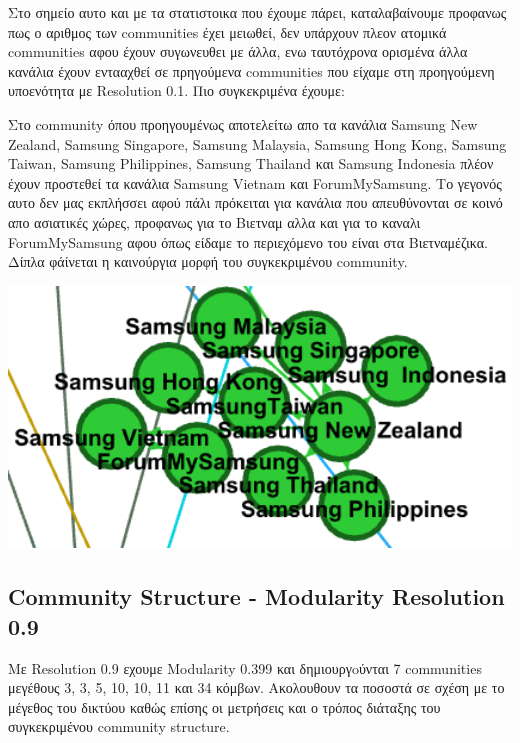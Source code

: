 \documentclass[12pt]{article}
\begin{document}
	\newpage
	Στο σημείο αυτο και με τα στατιστοικα που έχουμε πάρει, καταλαβαίνουμε προφανως πως ο αριθμος των communities έχει μειωθεί, δεν υπάρχουν πλεον ατομικά communities αφου έχουν συγωνευθει με άλλα, ενω ταυτόχρονα ορισμένα άλλα κανάλια έχουν εντααχθεί σε πρηγούμενα communities που είχαμε στη προηγούμενη υποενότητα με Resolution 0.1. Πιο συγκεκριμένα έχουμε:
	
	\vspace{12pt}
	\vspace{12pt}
	\vspace{12pt}
	\begin{minipage}{0.6\textwidth}
		Στο community όπου προηγουμένως αποτελείτω απο τα κανάλια Samsung New Zealand, Samsung Singapore, Samsung Malaysia, Samsung Hong Kong, Samsung Taiwan, Samsung Philippines, Samsung Thailand και Samsung Indonesia πλέον έχουν προστεθεί τα κανάλια Samsung Vietnam και ForumMySamsung. Το γεγονός αυτο δεν μας εκπλήσσει αφού πάλι πρόκειται για κανάλια που απευθύνονται σε κοινό απο ασιατικές χώρες, προφανως για το Βιετναμ αλλα και για το καναλι ForumMySamsung αφου όπως είδαμε το περιεχόμενο του είναι στα Βιετναμέζικα. Δίπλα φάίνεται η καινούργια μορφή του συγκεκριμένου community.
	\end{minipage}
	\hspace{0.05\textwidth}
	\begin{minipage}{0.3\textwidth}
		\includegraphics[width=1.15\textwidth]{photos-files/section12/0.5/vietnam_j_forum.png}
	\end{minipage}
	
		
	\newpage
	\subsection{Community Structure - Modularity Resolution 0.9}
	Με Resolution 0.9 εχουμε Modularity 0.399 και δημιουργoύνται 7 communities μεγέθους 3, 3, 5, 10, 10, 11 και 34 κόμβων. Ακολουθουν τα ποσοστά σε σχέση με το μέγεθος του δικτύου καθώς επίσης οι μετρήσεις και ο τρόπος διάταξης του συγκεκριμένου community structure.
	
\end{document}
